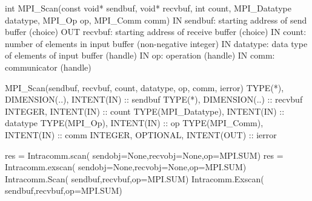 int MPI_Scan(const void* sendbuf, void* recvbuf,
    int count, MPI_Datatype datatype, MPI_Op op, MPI_Comm comm)
IN sendbuf: starting address of send buffer (choice)
OUT recvbuf: starting address of receive buffer (choice)
IN count: number of elements in input buffer (non-negative integer)
IN datatype: data type of elements of input buffer (handle)
IN op: operation (handle)
IN comm: communicator (handle)

MPI_Scan(sendbuf, recvbuf, count, datatype, op, comm, ierror)
TYPE(*), DIMENSION(..), INTENT(IN) :: sendbuf
TYPE(*), DIMENSION(..) :: recvbuf
INTEGER, INTENT(IN) :: count
TYPE(MPI_Datatype), INTENT(IN) :: datatype
TYPE(MPI_Op), INTENT(IN) :: op
TYPE(MPI_Comm), INTENT(IN) :: comm
INTEGER, OPTIONAL, INTENT(OUT) :: ierror

res = Intracomm.scan( sendobj=None,recvobj=None,op=MPI.SUM)
res = Intracomm.exscan( sendobj=None,recvobj=None,op=MPI.SUM)
Intracomm.Scan( sendbuf,recvbuf,op=MPI.SUM)
Intracomm.Exscan( sendbuf,recvbuf,op=MPI.SUM)
